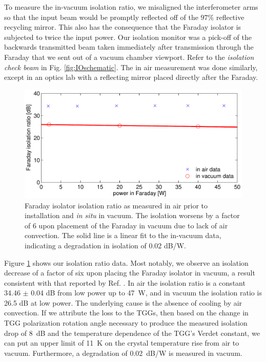To measure the in-vacuum isolation ratio, we misaligned the
interferometer arms so that the input beam would be 
promptly reflected off of the $97\%$ reflective recycling mirror. This
also has the consequence that 
the Faraday isolator is subjected to twice the input
power. Our isolation monitor was a pick-off of the backwards 
transmitted beam taken immediately after transmission
through the Faraday that we sent out of a vacuum chamber
viewport. Refer to the \emph{isolation check beam} in 
Fig. \ref{fig:IOschematic}. The in air measurement was done similarly,
except in an optics lab with a reflecting mirror placed directly after
the Faraday. 

\begin{figure}
\begin{centering}
\includegraphics[width=1.0\columnwidth]{figures/FaradayIR.pdf}
\caption[Faraday isolator isolation ratio as measured in air and in
vacuum]{Faraday isolator isolation ratio as measured in air prior to
  installation and \emph{in situ} in vacuum. The isolation worsens by
  a factor of 6 upon placement of the Faraday in vacuum due to lack of
  air convection. The solid line is a linear fit to the in-vacuum
  data, indicating a degradation in isolation of 0.02 dB/W.}
\label{fig:IR}
\end{centering}
\end{figure}

Figure \ref{fig:IR} shows our isolation ratio data. Most notably, we
observe an isolation decrease of a factor of six upon placing the
Faraday isolator in vacuum, a result consistent with that reported by
Ref. \citep{TheVIRGOCollaboration2008Invacuum}. In air the isolation
ratio is a constant 34.46 $\pm$ 0.04 dB from low power up to 47~W, and
in vacuum the isolation ratio is 26.5 dB at low power. The underlying
cause is the absence of cooling by air convection. If we attribute the
loss to the TGGs, then based on the change in TGG polarization
rotation angle necessary to produce the measured isolation drop of
8~dB and the temperature dependence of the TGG's Verdet constant, we
can put an upper limit of 11~K on the crystal temperature rise from
air to vacuum. Furthermore, a degradation of 0.02~dB/W is measured in
vacuum.

